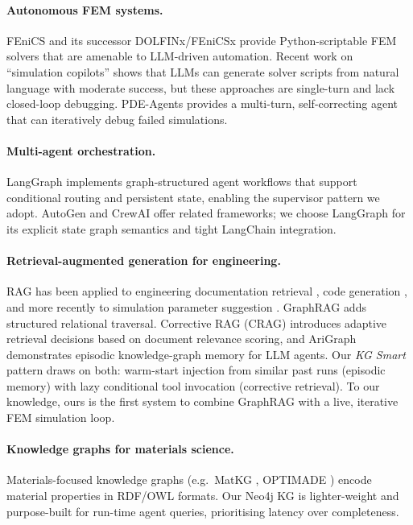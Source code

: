 \documentclass[twocolumn]{article}
\begin{document}
\paragraph{Autonomous FEM systems.}
FEniCS \citep{logg2012fenics} and its successor DOLFINx/FEniCSx
\citep{barrata2023dolfinx} provide Python-scriptable FEM solvers that are
amenable to LLM-driven automation.  Recent work on ``simulation copilots''
\citep{bauer2023llm, jiang2024llm} shows that LLMs can generate solver
scripts from natural language with moderate success, but these approaches are
single-turn and lack closed-loop debugging.  PDE-Agents provides a
multi-turn, self-correcting agent that can iteratively debug failed simulations.

\paragraph{Multi-agent orchestration.}
LangGraph \citep{langgraph2024} implements graph-structured agent workflows
that support conditional routing and persistent state, enabling the supervisor
pattern we adopt.  AutoGen \citep{wu2023autogen} and CrewAI \citep{crewai2024}
offer related frameworks; we choose LangGraph for its explicit
state graph semantics and tight LangChain integration.

\paragraph{Retrieval-augmented generation for engineering.}
RAG \citep{lewis2020rag} has been applied to engineering documentation
retrieval \citep{liao2023rag}, code generation \citep{gao2023rag}, and more
recently to simulation parameter suggestion \citep{yang2024rag}.  GraphRAG
\citep{edge2024graphrag} adds structured relational traversal.
Corrective RAG (CRAG) \citep{yan2024crag} introduces adaptive retrieval
decisions based on document relevance scoring, and AriGraph
\citep{arigraph2024} demonstrates episodic knowledge-graph memory for LLM
agents.  Our \emph{KG Smart} pattern draws on both: warm-start injection
from similar past runs (episodic memory) with lazy conditional tool
invocation (corrective retrieval).  To our knowledge, ours is the first
system to combine GraphRAG with a live, iterative FEM simulation loop.

\paragraph{Knowledge graphs for materials science.}
Materials-focused knowledge graphs (e.g.\ MatKG \citep{venugopal2022matkg},
OPTIMADE \citep{andersen2021optimade}) encode material properties in RDF/OWL
formats.  Our Neo4j KG is lighter-weight and purpose-built for run-time
agent queries, prioritising latency over completeness.
\end{document}
